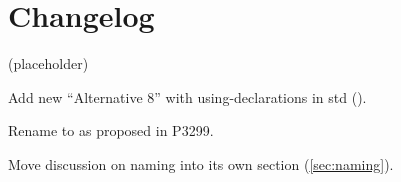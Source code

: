 \section{Changelog}
(placeholder)
\begin{revision}
\item Add new “Alternative 8” with using-declarations in std ().
\item Rename  to  as proposed in P3299.
\item Move discussion on naming into its own section (\ref{sec:naming}).
\end{revision}
